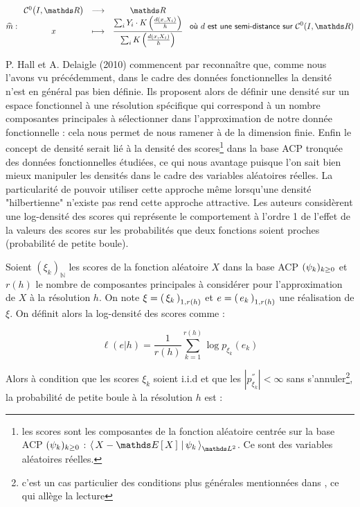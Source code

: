 {{        \begin{equation}
            \widehat m : \func{\mathcal C^0\bigl(I, \mathds R\bigr)}{\mathds R}{x}{
                \displaystyle\frac{\sum_i Y_i \cdot K\left( \frac{d(x, X_i)}{h} \right)}{\sum_i K\left( \frac{d(x, X_i)}{h} \right)}
            } \textsf{ où } d \textsf{ est une semi-distance sur } \mathcal C^0(I, \mathds R)
        \end{equation}

        P. Hall et A. Delaigle (2010) commencent par reconnaître que, comme nous l'avons vu précédemment, dans le cadre des données fonctionnelles la densité n'est en général pas bien définie. Ils proposent alors de définir une \og densité \fg sur un espace fonctionnel à une résolution spécifique qui correspond à un nombre composantes principales à sélectionner dans l'approximation de notre donnée fonctionnelle : cela nous permet de nous ramener à de la dimension finie. Enfin le concept de densité serait lié à la densité des scores\footnote{les scores sont les composantes de la fonction aléatoire centrée sur la base ACP $\suite \psi k$ : $\prodscalselon {X - \esperance X} {\psi_k} {\mathds L^2}$. Ce sont des variables aléatoires réelles.} dans la base ACP tronquée des données fonctionnelles étudiées, ce qui nous avantage puisque l'on sait bien mieux manipuler les densités dans le cadre des variables aléatoires réelles.\cite{delaigle2010defining} La particularité de pouvoir utiliser cette approche même lorsqu'une densité "hilbertienne" n'existe pas rend cette approche attractive. Les auteurs considèrent une log-densité des scores qui représente le comportement à l'ordre 1 de l'effet de la valeurs des scores sur les probabilités que deux fonctions soient proches (probabilité de petite boule).

        \bigskip

        Soient $(\xi_k)_{\mathds N}$ les scores de la fonction aléatoire $X$ dans la base ACP $\suite \psi k$ et $r(h)$ le nombre de composantes principales à considérer pour l'approximation de $X$ à la résolution $h$. On note $\xi = \famfinie[k] \xi 1 {r(h)}$ et $e = \famfinie[k] e 1 {r(h)}$ une réalisation de $\xi$. On définit alors la log-densité des scores comme :

        \begin{equation}
            \ell(e | h) = \frac 1 {r(h)}\sum_{k=1}^{r(h)} \log p_{\xi_k} (e_k)
        \end{equation}

        Alors à condition que les scores $\xi_k$ soient i.i.d et que les $|p_{\xi_k}^{''}| < \infty$ sans s'annuler\footnote{c'est un cas particulier des conditions plus générales mentionnées dans \cite{delaigle2010defining}, ce qui allège la lecture}, la probabilité de petite boule à la résolution $h$ est :

}}
